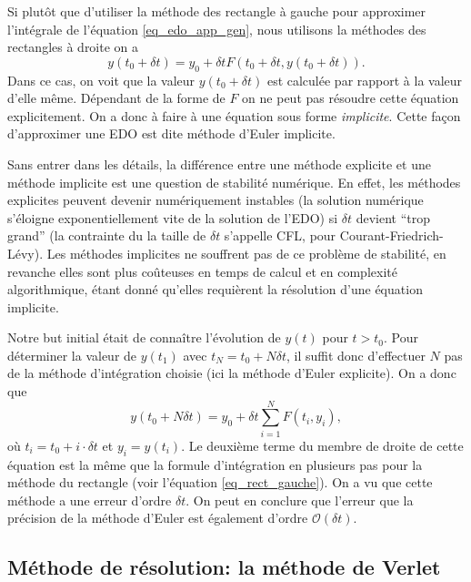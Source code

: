 \documentclass[a4paper,12pt]{book}
\begin{document}
Si plutôt que d'utiliser la méthode des rectangle à gauche pour approximer l'intégrale de l'équation \eqref{eq_edo_app_gen}, nous utilisons
la méthodes des rectangles à droite on a
\begin{equation}
 y(t_0+\delta t)=y_0+\delta t F(t_0+\delta t,y(t_0+\delta t)).
\end{equation}
Dans ce cas, on voit que la valeur $y(t_0+\delta t)$ est calculée par rapport à la valeur d'elle même. Dépendant 
de la forme de $F$ on ne peut pas résoudre cette équation explicitement. On a donc à faire à une 
équation sous forme \textit{implicite}. Cette façon d'approximer une EDO 
est dite méthode d'Euler implicite.

Sans entrer dans les détails, la différence entre une méthode explicite et une méthode implicite 
est une question de stabilité numérique. En effet, les méthodes explicites
peuvent devenir numériquement instables (la solution numérique s'éloigne exponentiellement vite de la solution
de l'EDO) si $\delta t$ devient ``trop grand'' (la contrainte du la taille de $\delta t$ s'appelle CFL, pour Courant-Friedrich-Lévy). 
Les méthodes implicites ne souffrent pas de ce problème de stabilité, en revanche elles sont plus coûteuses en temps de calcul
et en complexité algorithmique, étant donné qu'elles requièrent la résolution d'une équation implicite.

Notre but initial était de connaître l'évolution de $y(t)$ pour $t>t_0$. Pour déterminer 
la valeur de $y(t_1)$ avec $t_N=t_0+N\delta t$, il suffit donc d'effectuer $N$ pas 
de la méthode d'intégration choisie (ici la méthode d'Euler explicite). On a donc que
\begin{equation}
 y(t_0+N\delta t)=y_0+\delta t\sum_{i=1}^{N}F(t_i,y_i),
\end{equation}
où $t_i=t_0+i\cdot\delta t$ et $y_i=y(t_i)$. Le deuxième terme du membre de droite de cette équation est la même que la formule d'intégration 
en plusieurs pas pour la méthode du rectangle (voir l'équation \eqref{eq_rect_gauche}). On a vu que cette méthode a une erreur d'ordre $\delta t$.
On peut en conclure que l'erreur que la précision de la méthode d'Euler est également d'ordre $\mathcal{O}(\delta t)$.

\subsection{Méthode de résolution: la méthode de Verlet}
\end{document}

